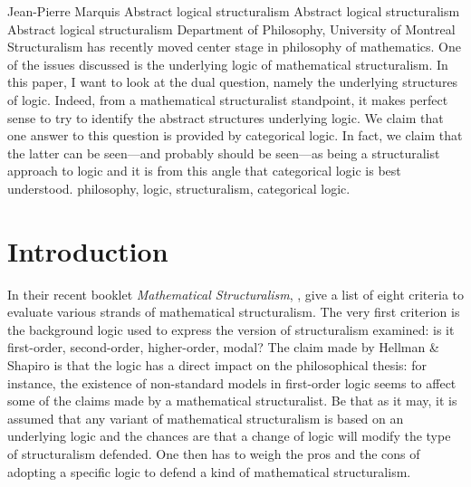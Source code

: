 \begin{artengenv}{Jean-Pierre Marquis}
	{Abstract logical structuralism}
	{Abstract logical structuralism}
	{Abstract logical structuralism}
	{Department of Philosophy, University of Montreal}
	{Structuralism has recently moved center stage in philosophy of mathematics. One of the issues discussed is the underlying logic of mathematical structuralism. In this paper, I want to look at the dual question, namely the underlying structures of logic. Indeed, from a mathematical structuralist standpoint, it makes perfect sense to try to identify the abstract structures underlying logic. We claim that one answer to this question is provided by categorical logic. In fact, we claim that the latter can be seen---and probably should be seen---as being a structuralist approach to logic and it is from this angle that categorical logic is best understood.}
	{philosophy, logic, structuralism, categorical logic.}





\section{Introduction}
\lettrine[loversize=0.13,lines=2,lraise=-0.03,nindent=0em,findent=0.2pt]%
{I}{}n their recent booklet \emph{Mathematical Structuralism}, \citeauthor{HellmanShap2019} \parencite*{HellmanShap2019}, %
give a list of eight criteria to evaluate various strands of mathematical structuralism. The very first criterion is the background logic used to express the version of structuralism examined: is it first-order, second-order, higher-order, modal? The claim made by Hellman \& Shapiro is that the logic has a direct impact on the philosophical thesis: for instance, the existence of non-standard models in first-order logic seems to affect some of the claims made by a mathematical structuralist. Be that as it may, it is assumed that any variant of mathematical structuralism is based on an underlying logic and the chances are that a change of logic will modify the type of structuralism defended. One then has to weigh the pros and the cons of adopting a specific logic to defend a kind of mathematical structuralism. 


\end{artengenv}

